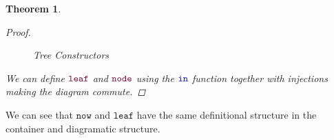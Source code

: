\documentclass[twoside,11pt,openright]{report}
\theoremstyle{plain} %
\newtheorem{thm}{Theorem}[section]
\theoremstyle{definition}
\theoremstyle{remark}
\newcommand*{\type}[1]{\textcolor{magenta!90!black}{#1}}
\newcommand*{\universe}[1]{\textcolor{orange!80!black}{#1}}
\newcommand*{\function}[1]{\textcolor{blue!60!black}{\ensuremath{\mathtt{#1}}}}
\newcommand*{\constructor}[1]{\textcolor{purple!60!black}{\ensuremath{\mathtt{#1}}}}
\newcommand*{\typeformer}[1]{\ensuremath{\mathtt{#1}}}
\begin{document}
\begin{thm}
\begin{proof}
\begin{figure}[h]
  \centering
  \caption{Tree Constructors}
  \label{fig:tree-constructors}
\end{figure}
We can define \(\constructor{leaf}\) and \(\constructor{node}\) using the \(\function{in}\) function together with injections making the diagram commute. 
\end{proof}
\end{thm}
\noindent We can see that \constructor{now} and \constructor{leaf} have the same definitional structure in the container and diagramatic structure.
\end{document}
